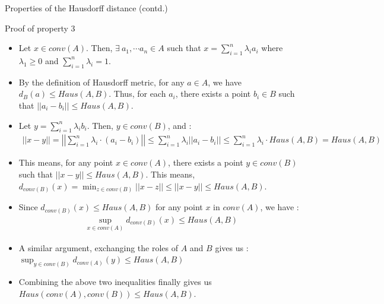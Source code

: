 \documentclass[8pt,aspectratio=169]{beamer}
\begin{document}
\begin{frame}{Properties of the Hausdorff distance (contd.)}
    \begin{block}{Proof of property 3}
        \begin{itemize}
            \item Let $x \in conv(A)$. Then, $\exists \ a_1, \cdots a_n \in A$ such that $x = \sum_{i=1}^n \lambda_i a_i$ where $\lambda_1\geq 0$ and $\sum_{i=1}^n \lambda_i = 1$.
            \item By the definition of Hausdorff metric, for any $a\in A$, we have $d_B(a) \leq Haus(A, B)$. Thus, for each $a_i$, there exists a point $b_i \in B$ such that $||a_i - b_i|| \leq Haus(A, B)$.
            \item Let $y = \sum_{i=1}^n \lambda_i b_i$. Then, $y\in conv(B)$, and :
            \begin{align*}
                ||x - y|| = \left\vert \left\vert\sum_{i=1}^n \lambda_i\cdot(a_i - b_i) \right\vert \right\vert \leq \sum_{i=1}^n \lambda_i ||a_i - b_i|| \leq \sum_{i=1}^n \lambda_i\cdot Haus(A, B) = Haus(A, B)
            \end{align*}
            \item This means, for any point $x \in conv(A)$, there exists a point $y \in conv(B)$ such that $||x-y|| \leq Haus(A, B)$. This means, $d_{conv(B)}(x) = \min_{z\in conv(B)}||x-z|| \leq ||x-y|| \leq Haus(A, B)$. 
            \item Since $d_{conv(B)}(x) \leq Haus(A, B)$ for any point $x$ in $conv(A)$, we have :
            \begin{align*}
                \sup_{x \in conv(A)} d_{conv(B)}(x) \leq Haus(A, B)
            \end{align*}
            \item A similar argument, exchanging the roles of $A$ and $B$ gives us : $\sup_{y \in conv(B)} d_{conv(A)}(y) \leq Haus(A, B)$
            \item Combining the above two inequalities finally gives us $Haus(conv(A), conv(B)) \leq Haus(A, B)$.
        \end{itemize}        
    \end{block}    
\end{frame}
\end{document}

